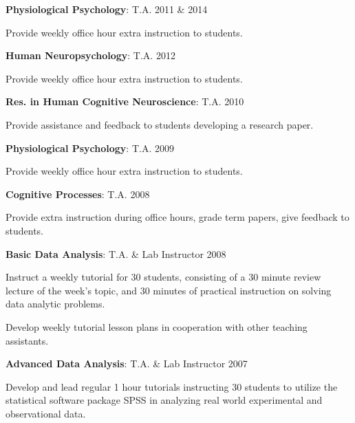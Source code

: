 \documentclass[10pt]{article}
\newenvironment{innerlist}[1][\enskip\textbullet]%
        {\begin{compactenum}[#1]}{\end{compactenum}}
\providecommand{\tightlist}{%
  \setlength{\itemsep}{0pt}\setlength{\parskip}{0pt}}
\begin{document}
\begin{outerlist}
\tightlist
\item
  \textbf{Physiological Psychology}: T.A. \hfill    2011 \& 2014

 \begin{innerlist}
  \tightlist
  \item
    Provide weekly office hour extra instruction to students.
 \end{innerlist}
\item
  \textbf{Human Neuropsychology}: T.A. \hfill    2012

 \begin{innerlist}
  \tightlist
  \item
    Provide weekly office hour extra instruction to students.
 \end{innerlist}
\item
  \textbf{Res. in Human Cognitive Neuroscience}: T.A. \hfill    2010

 \begin{innerlist}
  \tightlist
  \item
    Provide assistance and feedback to students developing a research
    paper.
 \end{innerlist}
\item
  \textbf{Physiological Psychology}: T.A. \hfill    2009

 \begin{innerlist}
  \tightlist
  \item
    Provide weekly office hour extra instruction to students.
 \end{innerlist}
\item
  \textbf{Cognitive Processes}: T.A. \hfill    2008

 \begin{innerlist}
  \tightlist
  \item
    Provide extra instruction during office hours, grade term papers,
    give feedback to students.
 \end{innerlist}
\item
  \textbf{Basic Data Analysis}: T.A. \& Lab Instructor \hfill    2008

 \begin{innerlist}
  \tightlist
  \item
    Instruct a weekly tutorial for 30 students, consisting of a 30
    minute review lecture of the week's topic, and 30 minutes of
    practical instruction on solving data analytic problems.
  \item
    Develop weekly tutorial lesson plans in cooperation with other
    teaching assistants.
 \end{innerlist}
\item
  \textbf{Advanced Data Analysis}: T.A. \& Lab Instructor \hfill 2007

 \begin{innerlist}
  \tightlist
  \item
    Develop and lead regular 1 hour tutorials instructing 30 students to
    utilize the statistical software package SPSS in analyzing real
    world experimental and observational data.
 \end{innerlist}
\end{outerlist}
\end{document}
